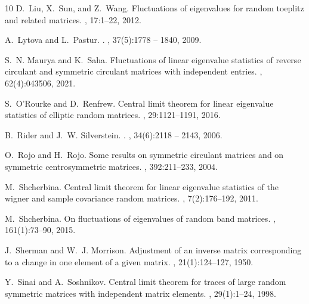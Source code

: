 \documentclass[12pt]{amsart}
\theoremstyle{plain}
\theoremstyle{definition}
\begin{document}
\begin{thebibliography}{10}
D.~Liu, X.~Sun, and Z.~Wang.
\newblock Fluctuations of eigenvalues for random toeplitz and related matrices.
, 17:1--22, 2012.

A.~Lytova and L.~Pastur.
.
, 37(5):1778 -- 1840, 2009.

S.~N. Maurya and K.~Saha.
\newblock Fluctuations of linear eigenvalue statistics of reverse circulant and
  symmetric circulant matrices with independent entries.
, 62(4):043506, 2021.

S.~O’Rourke and D.~Renfrew.
\newblock Central limit theorem for linear eigenvalue statistics of elliptic
  random matrices.
, 29:1121--1191, 2016.

B.~Rider and J.~W. Silverstein.
.
, 34(6):2118 -- 2143, 2006.

O.~Rojo and H.~Rojo.
\newblock Some results on symmetric circulant matrices and on symmetric
  centrosymmetric matrices.
, 392:211--233, 2004.

M.~Shcherbina.
\newblock Central limit theorem for linear eigenvalue statistics of the wigner
  and sample covariance random matrices.
,
  7(2):176--192, 2011.

M.~Shcherbina.
\newblock On fluctuations of eigenvalues of random band matrices.
, 161(1):73--90, 2015.

J.~Sherman and W.~J. Morrison.
\newblock Adjustment of an inverse matrix corresponding to a change in one
  element of a given matrix.
, 21(1):124--127, 1950.

Y.~Sinai and A.~Soshnikov.
\newblock Central limit theorem for traces of large random symmetric matrices
  with independent matrix elements.
, 29(1):1--24, 1998.


\end{thebibliography}
\end{document}
